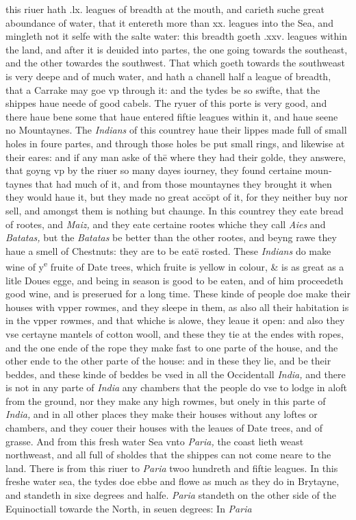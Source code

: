 \documentclass[11pt,twoside]{article}\makeatletter
\begin{document}
       this riuer hath .lx. leagues of breadth at the mouth, and carieth suche great aboundance of water, that it entereth more than xx. leagues into the Sea, and mingleth not it selfe with the salte water: this breadth goeth .xxv. leagues within the land, and after it is deuided into partes, the one going towards the southeast, and the other towardes the southwest. That which goeth towards the southweast is very deepe and of much wa­ter, and hath a chanell half a league of breadth, that a Carrake may goe vp through it: and the tydes be so swifte, that the shippes haue neede of good cabels. The ryuer of this porte is very good, and there haue bene some that haue entered fiftie leagues within it, and haue seene no Mountaynes. The {\itshape In­dians} of this countrey haue their lippes made full of small holes in foure partes, and through those holes be put small rings, and likewise at their eares: and if any man aske of thē where they had their golde, they answere, that goyng vp by the riuer so many dayes iourney, they found certaine moun­taynes that had much of it, and from those mountaynes they brought it when they would haue it, but they made no great accōpt of it, for they neither buy nor sell, and amongst them is nothing but chaunge. In this countrey they eate bread of rootes, and {\itshape Maiz,} and they eate certaine rootes whiche they call {\itshape Aies} and {\itshape Batatas,} but the {\itshape Batatas} be better than the other rootes, and beyng rawe they haue a smell of Chestnuts: they are to be eatē rosted. These {\itshape Indians} do make wine of y\textsuperscript{e} fruite of Date trees, which fruite is yellow in colour, \& is as great as a litle Doues egge, and being in season is good to be eaten, and of him proceedeth good wine, and is preserued for a long time. These kinde of people doe make their houses with vp­per rowmes, and they sleepe in them, as also all their habi­tation %
 is in the vpper rowmes, and that whiche is alowe, they leaue it open: and also they vse certayne mantels of cotton wooll, and these they tie at the endes with ropes, and the one ende of the rope they make fast to one parte of the house, and the other ende to the other parte of the house: and in these they lie, and be their beddes, and these kinde of beddes be vsed in all the Occidentall {\itshape India,} and there is not in any parte of {\itshape India} any chambers that the people do vse to lodge in aloft from the ground, nor they make any high rowmes, but onely in this parte of {\itshape India,} and in all other places they make their houses without any loftes or chambers, and they couer their houses with the leaues of Date trees, and of grasse. And from this fresh water Sea vnto {\itshape Paria,} the coast lieth weast northweast, and all full of sholdes that the shippes can not come neare to the land. There is from this riuer to {\itshape Paria} twoo hundreth and fiftie leagues. In this freshe water sea, the tydes doe ebbe and flowe as much as they do in Brytayne, and standeth in sixe degrees and halfe. {\itshape Paria} standeth on the other side of the Equinoctiall towarde the North, in seuen degrees: In {\itshape Paria} 
\end{document}
